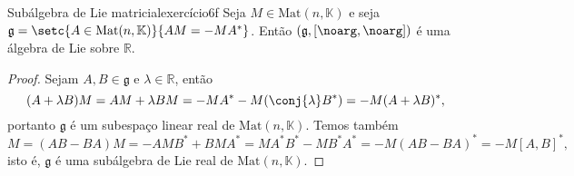\begin{proposition}{Subálgebra de Lie matricial}{exercício6f}
    Seja \(M \in \mathrm{Mat}(n, \mathbb{K})\) e seja \(\mathfrak{g} = \setc{A \in \mathrm{Mat}(n, \mathbb{K})}{AM = -MA^*}\). Então \((\mathfrak{g}, [\noarg, \noarg])\) é uma álgebra de Lie sobre \(\mathbb{R}\).
\end{proposition}
\begin{proof}
    Sejam \(A, B \in \mathfrak{g}\) e \(\lambda \in \mathbb{R}\), então
    \begin{equation*}
        (A+ \lambda B)M = AM + \lambda BM = -MA^* - M(\conj{\lambda}B^*) = -M(A + \lambda B)^*,
    \end{equation*}
    portanto \(\mathfrak{g}\) é um subespaço linear real de \(\mathrm{Mat}(n, \mathbb{K})\). Temos também
    \begin{equation*}
        [A,B]M = (AB - BA)M = -AMB^* + BMA^* = MA^*B^* - MB^*A^* = -M(AB - BA)^* = -M[A, B]^*,
    \end{equation*}
    isto é, \(\mathfrak{g}\) é uma subálgebra de Lie real de \(\mathrm{Mat}(n, \mathbb{K})\).
\end{proof}
